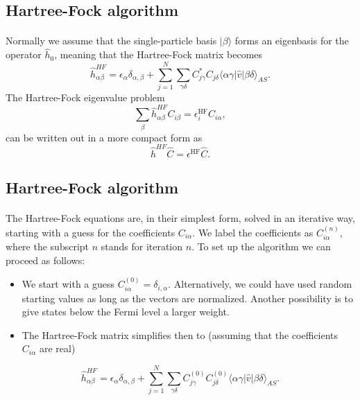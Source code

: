 \documentclass[%
twoside,                 %
final,                   %
10pt]{article}
\begin{document}
\subsection{Hartree-Fock algorithm}

\paragraph{}
Normally we assume that the single-particle basis $|\beta\rangle$ forms an eigenbasis for the operator
$\hat{h}_0$, meaning that the Hartree-Fock matrix becomes  
\[
\hat{h}_{\alpha\beta}^{HF}=\epsilon_{\alpha}\delta_{\alpha,\beta}+
\sum_{j=1}^N\sum_{\gamma\delta} C^*_{j\gamma}C_{j\delta}\langle \alpha\gamma|\hat{v}|\beta\delta\rangle_{AS}.
\]
The Hartree-Fock eigenvalue problem
\[
\sum_{\beta}\hat{h}_{\alpha\beta}^{HF}C_{i\beta}=\epsilon_i^{\mathrm{HF}}C_{i\alpha},
\]
can be written out in a more compact form as
\[
\hat{h}^{HF}\hat{C}=\epsilon^{\mathrm{HF}}\hat{C}. 
\]



\subsection{Hartree-Fock algorithm}

\paragraph{}
The Hartree-Fock equations are, in their simplest form, solved in an iterative way, starting with a guess for the
coefficients $C_{i\alpha}$. We label the coefficients as $C_{i\alpha}^{(n)}$, where the subscript $n$ stands for iteration $n$.
To set up the algorithm we can proceed as follows:

\begin{itemize}
 \item We start with a guess $C_{i\alpha}^{(0)}=\delta_{i,\alpha}$. Alternatively, we could have used random starting values as long as the vectors are normalized. Another possibility is to give states below the Fermi level a larger weight.

 \item The Hartree-Fock matrix simplifies then to (assuming that the coefficients $C_{i\alpha} $  are real)
\end{itemize}

\noindent
\[
\hat{h}_{\alpha\beta}^{HF}=\epsilon_{\alpha}\delta_{\alpha,\beta}+
\sum_{j = 1}^N\sum_{\gamma\delta} C_{j\gamma}^{(0)}C_{j\delta}^{(0)}\langle \alpha\gamma|\hat{v}|\beta\delta\rangle_{AS}.
\]
\end{document}
